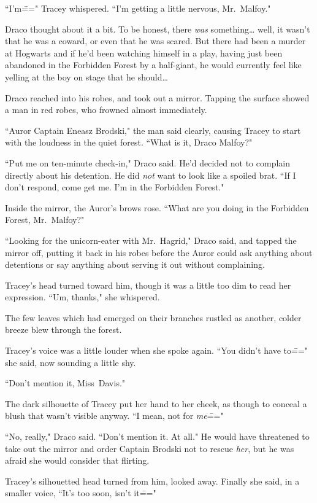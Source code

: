 ``I'm\===" Tracey whispered. ``I'm getting a little nervous, Mr.~Malfoy."

Draco thought about it a bit. To be honest, there \emph{was} something{\ldots} well, it wasn't that he was a coward, or even that he was scared. But there had been a murder at Hogwarts and if he'd been watching himself in a play, having just been abandoned in the Forbidden Forest by a half-giant, he would currently feel like yelling at the boy on stage that he should{\ldots}

Draco reached into his robes, and took out a mirror. Tapping the surface showed a man in red robes, who frowned almost immediately.

``Auror Captain Eneasz Brodski," the man said clearly, causing Tracey to start with the loudness in the quiet forest. ``What is it, Draco Malfoy?"

``Put me on ten-minute check-in," Draco said. He'd decided not to complain directly about his detention. He did \emph{not} want to look like a spoiled brat. ``If I don't respond, come get me. I'm in the Forbidden Forest."

Inside the mirror, the Auror's brows rose. ``What are you doing in the Forbidden Forest, Mr.~Malfoy?"

``Looking for the unicorn-eater with Mr.~Hagrid," Draco said, and tapped the mirror off, putting it back in his robes before the Auror could ask anything about detentions or say anything about serving it out without complaining.

Tracey's head turned toward him, though it was a little too dim to read her expression. ``Um, thanks," she whispered.

The few leaves which had emerged on their branches rustled as another, colder breeze blew through the forest.

Tracey's voice was a little louder when she spoke again. ``You didn't have to\===" she said, now sounding a little shy.

``Don't mention it, Miss~Davis."

The dark silhouette of Tracey put her hand to her cheek, as though to conceal a blush that wasn't visible anyway. ``I mean, not for \emph{me}\==="

``No, really," Draco said. ``Don't mention it. At all." He would have threatened to take out the mirror and order Captain Brodski not to rescue \emph{her}, but he was afraid she would consider that flirting.

Tracey's silhouetted head turned from him, looked away. Finally she said, in a smaller voice, ``It's too soon, isn't it\==="

